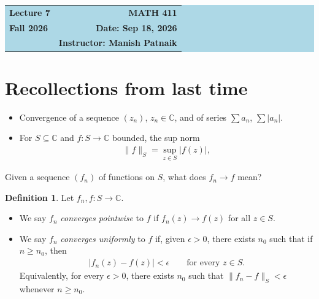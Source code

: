 \documentclass[11pt]{article}
\theoremstyle{plain}
\theoremstyle{definition}
\newtheorem{definition}[theorem]{Definition}
\theoremstyle{remark}
\numberwithin{equation}{section}
\newcommand{\be}{\begin{eqnarray}}
\newcommand{\ee}{\end{eqnarray}}
\newcommand{\C}{\mathbb{C}}
\begin{document}
\begin{center}
  \colorbox{lightblue}{%
    \begin{minipage}{0.94\textwidth}
      \vspace{0.55em}
      \begin{tabular*}{\textwidth}{@{\extracolsep{\fill}}lr}
        {\color{courseblue}\bfseries\LARGE Lecture 7} &
        {\color{courseblue}\bfseries\LARGE MATH 411}\\[0.35em]
        \textbf{Fall 2026} & \textbf{Date: Sep 18, 2026}\\
        & \textbf{Instructor: Manish Patnaik}
      \end{tabular*}
      \vspace{0.45em}
    \end{minipage}}
\end{center}

\setcounter{tocdepth}{1}
\tableofcontents
\vspace{0.45em}

\section{Recollections from last time}
\begin{itemize}
\item Convergence of a sequence $(z_n)$, $z_n\in\C$, and of series
$\sum a_n$, $\sum|a_n|$.
\item For $S\subseteq\C$ and $f:S\to\C$ bounded, the sup norm
\be
 \|f\|_S=\sup_{z\in S}|f(z)|,
\ee

\end{itemize}

Given a sequence $(f_n)$ of functions on $S$, what does $f_n\to f$ mean?

\begin{definition}
	Let $f_n,f:S\to\C$.
	\begin{itemize}
		\item We say $f_n$ \emph{converges pointwise} to $f$ if $f_n(z)\to f(z)$
		for all $z\in S$.
		\item We say $f_n$ \emph{converges uniformly} to $f$ if, given
		$\epsilon>0$, there exists $n_0$ such that if $n\ge n_0$, then
		\be
		|f_n(z)-f(z)|<\epsilon
		\qquad\text{for every }z\in S.
		\ee
		Equivalently, for every $\epsilon>0$, there exists $n_0$ such that
		$\|f_n-f\|_S<\epsilon$ whenever $n\ge n_0$.
	\end{itemize}
\end{definition}
%
\end{document}
